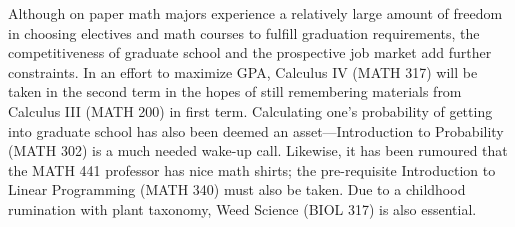 \documentclass[11pt, oneside]{article}   	%
\newcommand{\rowstyle}[1]{\gdef\currentrowstyle{#1} #1\ignorespaces}
\begin{document}
\begin{table}[h]                                          %
\begin{center}
\end{center}
\caption{Table of class locations, time, term(s) offered for all sections of elective classes.}
\label{elective}
\end{table}

Although on paper math majors experience a relatively large amount of freedom in choosing electives and math courses to fulfill graduation requirements, the competitiveness of graduate school and the prospective job market add further constraints. In an effort to maximize GPA, Calculus IV (MATH 317) will be taken in the second term in the hopes of still remembering materials from Calculus III (MATH 200) in first term. Calculating one's probability of getting into graduate school has also been deemed an asset---Introduction to Probability (MATH 302) is a much needed wake-up call. Likewise, it has been rumoured that the MATH 441 professor has nice math shirts; the pre-requisite Introduction to Linear Programming (MATH 340) must also be taken. Due to a childhood rumination with plant taxonomy, Weed Science (BIOL 317) is also essential. 
\end{document}
